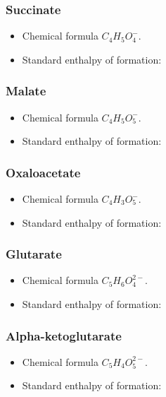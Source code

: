 \documentclass{article}
\begin{document}
\subsubsection{Succinate}
\begin{itemize}
    \item Chemical formula $C_4H_5O_4^-$.
    \item Standard enthalpy of formation:
\end{itemize}

\subsubsection{Malate}
\begin{itemize}
    \item Chemical formula $C_4H_5O_5^-$.
    \item Standard enthalpy of formation:
\end{itemize}

\subsubsection{Oxaloacetate}
\begin{itemize}
    \item Chemical formula $C_4H_3O_5^-$.
    \item Standard enthalpy of formation:
\end{itemize}

\subsubsection{Glutarate}
\begin{itemize}
    \item Chemical formula $C_5H_6O_4^{2-}$.
    \item Standard enthalpy of formation:
\end{itemize}

\subsubsection{Alpha-ketoglutarate}
\begin{itemize}
    \item Chemical formula $C_5H_4O_5^{2-}$.
    \item Standard enthalpy of formation:
\end{itemize}
\end{document}
